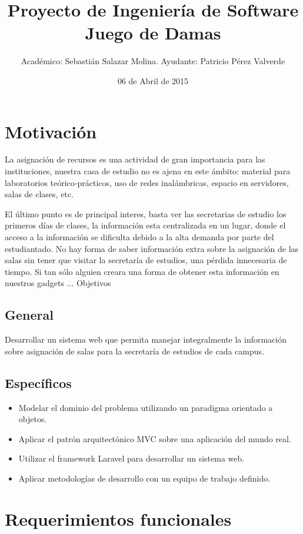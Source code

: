 \documentclass[a4paper,10pt]{article}
\title{Proyecto de Ingeniería de Software \newline Juego de Damas}
\author{Académico: Sebastián Salazar Molina. \newline Ayudante: Patricio Pérez Valverde }
\date{06 de Abril de 2015}
\begin{document}
\maketitle

\section{Motivación}

La asignación de recursos es una actividad de gran importancia para las instituciones, nuestra casa de estudio no es ajena en este ámbito: material para laboratorios teórico-prácticos, uso de redes inalámbricas, espacio en servidores, salas de clases, etc.

El último punto es de principal interes, basta ver las secretarias de estudio los primeros días de clases, la información esta centralizada en un lugar, donde el acceso a la información se dificulta debido a la alta demanda por parte del estudiantado. No hay forma de saber información extra sobre la asignación de las salas sin tener que visitar la secretaría de estudios, una pérdida innecesaria de tiempo. Si tan sólo alguien creara una forma de obtener esta información en nuestros gadgets ...
Objetivos

\subsection{General}

Desarrollar un sistema web que permita manejar integralmente la información sobre asignación de salas para la secretaría de estudios de cada campus.

\subsection{Específicos}

\begin{itemize}
 \item Modelar el dominio del problema utilizando un paradigma orientado a objetos.
 \item Aplicar el patrón arquitectónico MVC sobre una aplicación del mundo real.
 \item Utilizar el framework Laravel para desarrollar un sistema web.
 \item Aplicar metodologías de desarrollo con un equipo de trabajo definido.
\end{itemize}

    

\section{Requerimientos funcionales}
\end{document}
